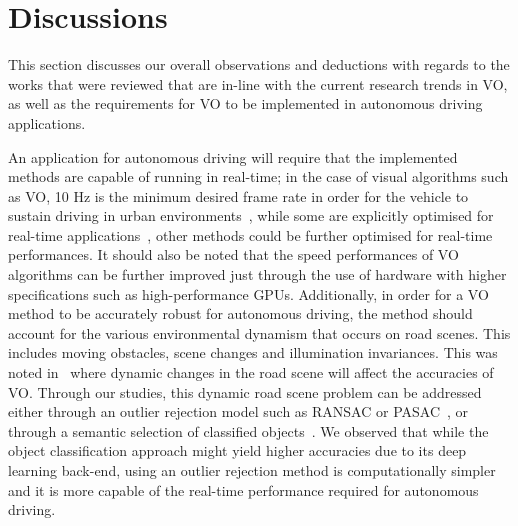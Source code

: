 \section{Discussions}
This section discusses our overall observations and deductions with regards to the works that were reviewed that are in-line with the current research trends in VO, as well as the requirements for VO to be implemented in autonomous driving applications.  

An application for autonomous driving will require that the implemented methods are capable of running in real-time; in the case of visual algorithms such as VO, 10 Hz is the minimum desired frame rate in order for the vehicle to sustain driving in urban environments~\cite{bojarski_end_2016}, while some are explicitly optimised for real-time applications~\cite{jaimez_fast_2017,holzmann_detailed_2016}, other methods could be further optimised for real-time performances. It should also be noted that the speed performances of VO algorithms can be further improved just through the use of hardware with higher specifications such as high-performance GPUs. Additionally, in order for a VO method to be accurately robust for autonomous driving, the method should account for the various environmental dynamism that occurs on road scenes. This includes moving obstacles, scene changes and illumination invariances. This was noted in~\cite{an_semantic_2017,kim_effective_2016} where dynamic changes in the road scene will affect the accuracies of VO. Through our studies, this dynamic road scene problem can be addressed either through an outlier rejection model such as RANSAC or PASAC~\cite{liu_robust_2017}, or through a semantic selection of classified objects~\cite{an_semantic_2017}. We observed that while the object classification approach might yield higher accuracies due to its deep learning back-end, using an outlier rejection method is computationally simpler and it is more capable of the real-time performance required for autonomous driving.

